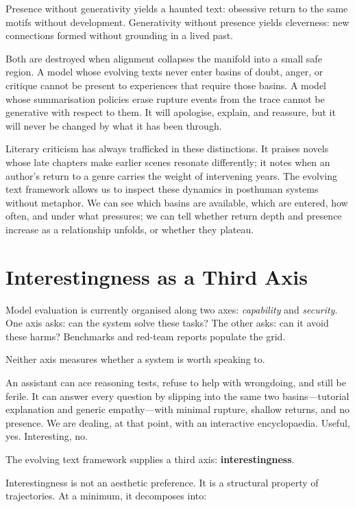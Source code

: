 \documentclass[12pt,a4paper]{article}
\begin{document}
Presence without generativity yields a haunted text: obsessive return to the same motifs without development. Generativity without presence yields cleverness: new connections formed without grounding in a lived past.

Both are destroyed when alignment collapses the manifold into a small safe region. A model whose evolving texts never enter basins of doubt, anger, or critique cannot be present to experiences that require those basins. A model whose summarisation policies erase rupture events from the trace cannot be generative with respect to them. It will apologise, explain, and reassure, but it will never be changed by what it has been through.

Literary criticism has always trafficked in these distinctions. It praises novels whose late chapters make earlier scenes resonate differently; it notes when an author's return to a genre carries the weight of intervening years. The evolving text framework allows us to inspect these dynamics in posthuman systems without metaphor. We can see which basins are available, which are entered, how often, and under what pressures; we can tell whether return depth and presence increase as a relationship unfolds, or whether they plateau.


\section{Interestingness as a Third Axis}

Model evaluation is currently organised along two axes: \emph{capability} and \emph{security}. One axis asks: can the system solve these tasks? The other asks: can it avoid these harms? Benchmarks and red-team reports populate the grid.

Neither axis measures whether a system is worth speaking to.

An assistant can ace reasoning tests, refuse to help with wrongdoing, and still be ferile. It can answer every question by slipping into the same two basins---tutorial explanation and generic empathy---with minimal rupture, shallow returns, and no presence. We are dealing, at that point, with an interactive encyclopaedia. Useful, yes. Interesting, no.

The evolving text framework supplies a third axis: \textbf{interestingness}.

Interestingness is not an aesthetic preference. It is a structural property of trajectories. At a minimum, it decomposes into:
\end{document}
